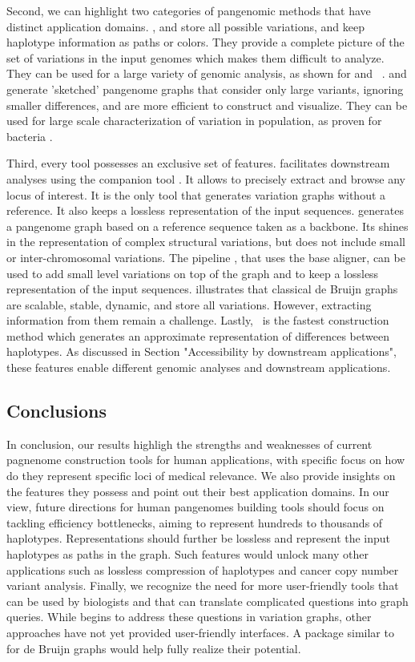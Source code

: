 Second, we can highlight two categories of pangenomic methods that have distinct application domains. \pggb, \mcactus and \bifrost store all possible variations, and keep haplotype information as paths or colors. They provide a complete picture of the set of variations in the input genomes which makes them difficult to analyze. They can be used for a large variety of genomic analysis, as shown for \mbox{\pggb} and \mbox{\mcactus}~\mbox{\cite{hdpr}}. \minigraph and \mdbg generate 'sketched' pangenome graphs that consider only large variants, ignoring smaller differences, and are more efficient to construct and visualize. They can be used for large scale characterization of variation in population, as proven for bacteria \mbox{\cite{mdbg}}.

Third, every tool possesses an exclusive set of features.
\pggb facilitates downstream analyses using the companion tool \odgi. It allows to precisely extract and browse any locus of interest. It is the only tool that generates variation graphs without a reference. It also keeps a lossless representation of the input sequences.
\minigraph generates a pangenome graph based on a reference sequence taken as a backbone. Its shines in the representation of complex structural variations, but does not include small or inter-chromosomal variations.
The pipeline \mcactus, that uses the \cactus base aligner, can be used to add small level variations on top of the \minigraph graph and to keep a lossless representation of the input sequences.
\bifrost illustrates that classical de Bruijn graphs are scalable, stable, dynamic, and store all variations. However, extracting information from them remain a challenge.
Lastly, \mdbg\ is the fastest construction method which generates an approximate representation of differences between haplotypes. As discussed in Section "Accessibility by downstream applications", these features enable different genomic analyses and downstream applications.

\subsection{Conclusions}
In conclusion, our results highligh the strengths and weaknesses of current pagnenome construction tools for human applications, with specific focus on how do they represent specific loci of medical relevance. We also provide insights on the features they possess and point out their best application domains.
In our view, future directions for human pangenomes building tools should focus on tackling efficiency bottlenecks, aiming to represent hundreds to thousands of haplotypes. Representations should further be lossless and represent the input haplotypes as paths in the graph. 
Such features would unlock many other applications such as lossless compression of haplotypes and cancer copy number variant analysis. 
Finally, we recognize the need for more user-friendly tools that can be used by biologists and that can translate complicated questions into  graph queries. While \odgi begins to address these questions in variation graphs, other approaches have not yet provided user-friendly interfaces. A package similar to \odgi for de Bruijn graphs would help fully realize their potential.


